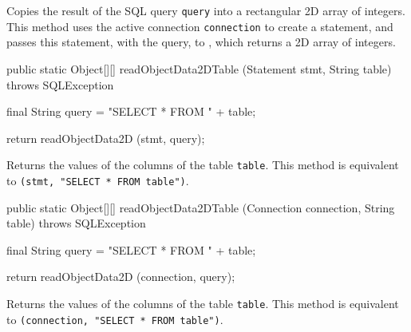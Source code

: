 \begin{tabb}
   Copies the result of the SQL query \texttt{query} into a rectangular 2D array
   of integers.
   This method uses the active connection \texttt{connection} to create
   a statement, and passes this statement, with the query, to
   , which returns a 2D
   array of integers.
\end{tabb}
\begin{htmlonly}
\end{htmlonly}
\begin{code}

   public static Object[][] readObjectData2DTable (Statement stmt,
                                                   String table)
            throws SQLException\begin{hide} {
        final String query = "SELECT * FROM " + table;
        
        return readObjectData2D (stmt, query);
    }\end{hide}
\end{code}
\begin{tabb}
   Returns the values of the columns of the table \texttt{table}.
   This method is equivalent to 
   \texttt{(stmt, "SELECT * FROM table")}.
\end{tabb}
\begin{code}

   public static Object[][] readObjectData2DTable (Connection connection,
                                                   String table)
            throws SQLException\begin{hide} {
        final String query = "SELECT * FROM " + table;
        
        return readObjectData2D (connection, query);
    }\end{hide}
\end{code}
\begin{tabb}
   Returns the values of the columns of the table \texttt{table}.
   This method is equivalent to 
   \texttt{(connection, "SELECT * FROM table")}.
\end{tabb}
\begin{code}\begin{hide}
}\end{hide}
\end{code}
